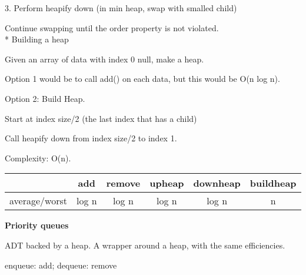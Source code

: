 \documentclass{exam}
\begin{document}
	3. Perform heapify down (in min heap, swap with smalled child)
	
	Continue swapping until the order property is not violated.\\
	
	* Building a heap
	
	Given an array of data with index 0 null, make a heap.
	
	Option 1 would be to call add() on each data, but this would be O(n log n).
	
	Option 2: Build Heap.
	
	Start at index size/2 (the last index that has a child)
	
	Call heapify down from index size/2 to index 1.
	
	Complexity: O(n).
	
	\begin{tabular}{c|ccccc}
		 &add&remove&upheap&downheap&buildheap\\
		\hline
		average/worst&log n&log n&log n &log n &n\\
	\end{tabular}
	
	\textbf{Priority queues}
	
	ADT backed by a heap. A wrapper around a heap, with the same efficiencies.
	
	enqueue: add; dequeue: remove
	
\end{document}

